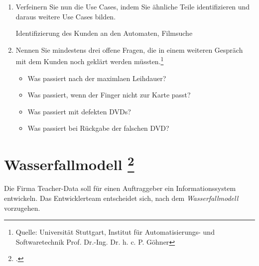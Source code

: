 \documentclass{bschlangaul-aufgabe}
\begin{document}
\begin{enumerate}

\item Verfeinern Sie nun die Use Cases, indem Sie ähnliche Teile
identifizieren und daraus weitere Use Cases bilden.

\begin{liAntwort}
Identifizierung des Kunden an den Automaten, Filmsuche
\end{liAntwort}


\item Nennen Sie mindestens drei offene Fragen, die in einem weiteren
Gespräch mit dem Kunden noch geklärt werden müssten.\footnote{Quelle:
Universität Stuttgart, Institut für Automatisierungs- und
Softwaretechnik Prof. Dr.-Ing. Dr. h. c. P. Göhner}

\begin{liAntwort}
\begin{itemize}
\item Was passiert nach der maximlaen Leihdauer?
\item Was passiert, wenn der Finger nicht zur Karte passt?
\item Was passiert mit defekten DVDs?
\item Was passiert bei Rückgabe der falschen DVD?
\end{itemize}
\end{liAntwort}
\end{enumerate}

%

\section{Wasserfallmodell
\footcite[Aufgabe 1]{sosy:ab:1}}

Die Firma Teacher-Data soll für einen Auftraggeber ein
Informationssystem entwickeln. Das Entwicklerteam entscheidet sich, nach
dem \emph{Wasserfallmodell} vorzugehen.
\end{document}
